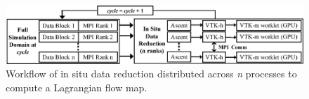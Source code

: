 \begin{figure}[!t]
\centering
\includegraphics[width=\linewidth]{Images/insitu_infrastructure_flat.eps}
\caption{Workflow of in situ data reduction distributed across \textit{n} processes to compute a Lagrangian flow map.}
\vspace{-5mm}
\label{fig:insituinfrastructure}
\end{figure}

